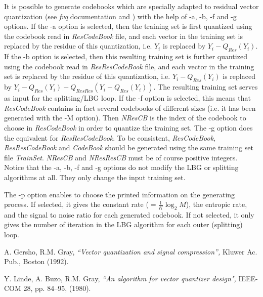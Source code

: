 It is possible to generate codebooks which are specially adapted to residual 
vector quantization (see {\em fvq} documentation and \cite{kn:gg}) 
with the help of -a, -b, -f and -g options. If the -a option is selected, 
then the training set is first quantized using the codebook read in 
{\em ResCodeBook} file, and each vector in the training set is 
replaced by the residue of this quantization, i.e. $Y_i$ is replaced 
by $Y_i-Q_{Res}(Y_i)$. If the -b option is selected, then this resulting 
training set is further quantized using the codebook read in 
{\em ResResCodeBook} file, and each vector in the training set is 
replaced by the residue of this quantization, i.e. $Y_i-Q_{Res}(Y_i)$ 
is replaced by $Y_i-Q_{Res}(Y_i) - Q_{ResRes}(Y_i-Q_{Res}(Y_i))$. 
The resulting training set serves as input for the splitting/LBG loop. 
If the -f option is selected, this means that {\em ResCodeBook} 
contains in fact several codebooks of different sizes (i.e. it has 
been generated with the -M option). Then {\em NResCB} is the index 
of the codebook to choose in {\em ResCodeBook} in order to quantize 
the training set. The -g option does the equivalent for {\em ResResCodeBook}. 
To be consistent, {\em ResCodeBook}, {\em ResResCodeBook} and {\em CodeBook}
should be generated using the same training set file {\em TrainSet}. 
{\em NResCB} and {\em NResResCB} must be of course positive integers. 
Notice that the -a, -b, -f and -g options do not modify the LBG 
or splitting algorithms at all. They only change the input training set. 

The -p option enables to choose the printed information on the 
generating process. If selected, it gives the constant rate 
($= \frac{1}{K} \log_2 M$), the entropic rate, and the signal to noise ratio 
for each generated codebook. If not selected, it only gives the number 
of iteration in the LBG algorithm for each outer (splitting) loop. 


\begin{thebibliography}{999999}

 A. Gersho, R.M. Gray, {\em ``Vector quantization 
and signal compression'', } Kluwer Ac. Pub., Boston (1992). 

 Y. Linde, A. Buzo, R.M. Gray, {\em ``An algorithm for 
vector quantizer design", } IEEE-COM 28, pp. 84--95, (1980).

\end{thebibliography}

\vspace{0.5cm}

